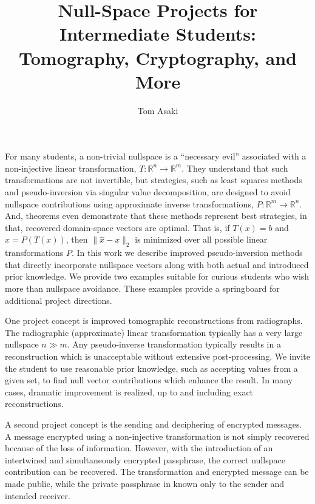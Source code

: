 \documentclass[a4paper]{amsart}
\date{}
\begin{document}
\title{Null-Space Projects for Intermediate Students:\\ Tomography, Cryptography, and More}
\author{Tom Asaki} %
\address{Washington State University} %

\maketitle

For many students, a non-trivial nullspace is a ``necessary evil'' associated with a non-injective linear transformation, $T:\mathbb{R}^n\rightarrow\mathbb{R}^m$.  They understand that such transformations are not invertible, but strategies, such as least squares methods and pseudo-inversion via singular value decomposition, are designed to avoid nullspace contributions using approximate inverse transformations, $P:\mathbb{R}^m\rightarrow\mathbb{R}^n$.  And, theorems even demonstrate that these methods represent best strategies, in that, recovered domain-space vectors are optimal.  That is, if $T(x)=b$ and $\hat{x}=P(T(x))$, then $\|\hat{x}-x\|_2$ is minimized over all possible linear transformations $P$.  In this work we describe improved pseudo-inversion methods that directly incorporate nullspace vectors along with both actual and introduced prior knowledge.  We provide two examples suitable for curious students who wish more than nullspace avoidance.  These examples provide a springboard for additional project directions.

One project concept is improved tomographic reconstructions from radiographs.  The radiographic (approximate) linear transformation typically has a very large nullspace $n\gg m$.  Any pseudo-inverse transformation typically results in a reconstruction which is unacceptable without extensive post-processing.  We invite the student to use reasonable prior knowledge, such as accepting values from a given set, to find null vector contributions which enhance the result.  In many cases, dramatic improvement is realized, up to and including exact reconstructions.

A second project concept is the sending and deciphering of encrypted messages.  A message encrypted using a non-injective transformation is not simply recovered because of the loss of information.  However, with the introduction of an intertwined and simultaneously encrypted passphrase, the correct nullspace contribution can be recovered.  The transformation and encrypted message can be made public, while the private passphrase in known only to the sender and intended receiver.  
\end{document}
